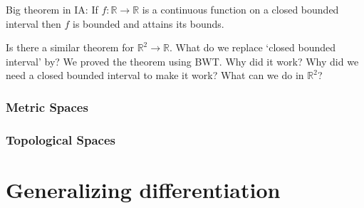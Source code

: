     Big theorem in IA: If $f: \mathbb{R} \to \mathbb{R}$ is a continuous function on a closed bounded interval then $f$ is bounded and attains its bounds.

    Is there a similar theorem for $\mathbb{R}^2 \to \mathbb{R}$.
    What do we replace `closed bounded interval' by?
    We proved the theorem using BWT.
    Why did it work?
    Why did we need a closed bounded interval to make it work?
    What can we do in $\mathbb{R}^2$?

    \section{Metric Spaces}
    \section{Topological Spaces}
    \part{Generalizing differentiation}
